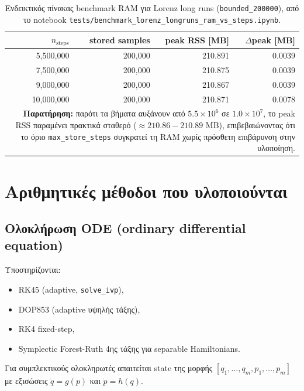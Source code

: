 \documentclass[11pt,a4paper]{report}
\begin{document}
\begin{table}[H]
\centering
\caption{Ενδεικτικός πίνακας benchmark RAM για Lorenz long runs (\texttt{bounded\_200000}), από το notebook \texttt{tests/benchmark\_lorenz\_longruns\_ram\_vs\_steps.ipynb}.}
\label{tab:ch2-ram-ceiling-benchmark}
\renewcommand{\arraystretch}{1.12}
\begin{tabular}{|r|r|r|r|}
\hline
\textbf{\(n_{\mathrm{steps}}\)} & \textbf{stored samples} & \textbf{peak RSS [MB]} & \textbf{\(\Delta\)peak [MB]} \\
\hline
5,500,000 & 200,000 & 210.891 & 0.0039 \\
7,500,000 & 200,000 & 210.875 & 0.0039 \\
9,000,000 & 200,000 & 210.867 & 0.0039 \\
10,000,000 & 200,000 & 210.871 & 0.0078 \\
\hline
\multicolumn{4}{|p{0.86\linewidth}|}{\textbf{Παρατήρηση:} παρότι τα βήματα αυξάνουν από \(5.5\times10^6\) σε \(1.0\times10^7\), το peak RSS παραμένει πρακτικά σταθερό (\(\approx 210.86{-}210.89\) MB), επιβεβαιώνοντας ότι το όριο \texttt{max\_store\_steps} συγκρατεί τη RAM χωρίς πρόσθετη επιβάρυνση στην υλοποίηση.} \\
\hline
\end{tabular}
\end{table}

\section{Αριθμητικές μέθοδοι που υλοποιούνται}

\subsection{Ολοκλήρωση ODE (ordinary differential equation)}
\label{subsec:ode-integration-impl}

Υποστηρίζονται:
\begin{itemize}
\item RK45 (adaptive, \texttt{solve\_ivp}),
\item DOP853 (adaptive υψηλής τάξης),
\item RK4 fixed-step,
\item Symplectic Forest-Ruth 4ης τάξης για separable Hamiltonians.
\end{itemize}

Για συμπλεκτικούς ολοκληρωτές απαιτείται state της μορφής
$[q_1,\dots,q_m,p_1,\dots,p_m]$ με εξισώσεις
$\dot{q}=g(p)$ και $\dot{p}=h(q)$.
\end{document}

